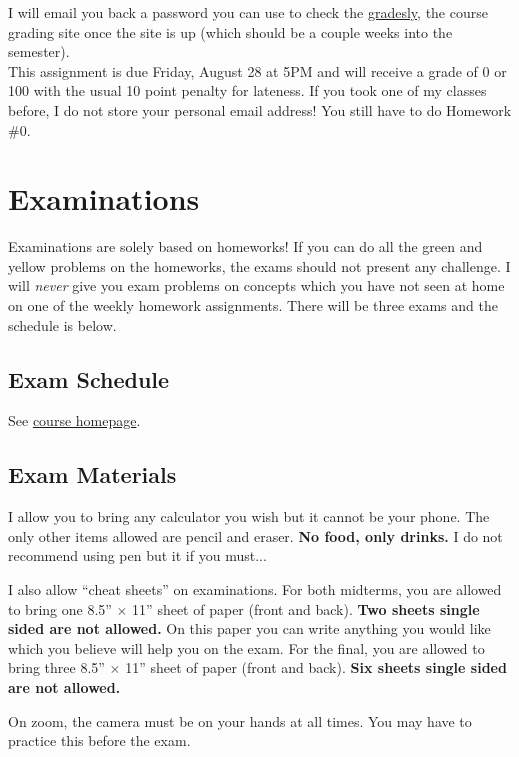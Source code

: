 \documentclass[12pt]{article}
\newcommand{\inred}[1]{\color{red}\textbf{#1} \color{black}}
\newcommand{\coursewebpage}{\href{https://github.com/kapelner/QC_Math_621_Fall_2020}{course homepage}}
\newcommand{\qu}[1]{``#1''}
\begin{document}
I will email you back a password you can use to check the \href{http://gradesly.com}{gradesly}, the course grading site once the site is up (which should be a couple weeks into the semester). \\

This assignment is due Friday, August 28 at 5PM and will receive a grade of 0 or 100 with the usual 10 point penalty for lateness. If you took one of my classes before, I do not store your personal email address! You still have to do Homework \#0.


\section*{Examinations}

Examinations are solely based on homeworks! If you can do all the green and yellow problems on the homeworks, the exams should not present any challenge. I will \textit{never} give you exam problems on concepts which you have not seen at home on one of the weekly homework assignments. There will be three exams and the schedule is below.

\subsection*{Exam Schedule}\label{subsec:exam_schedule}

See \coursewebpage.

\subsection*{Exam Materials}

I allow you to bring any calculator you wish but it cannot be your phone. The only other items allowed are pencil and eraser. \inred{No food, only drinks.} I do not recommend using pen but it if you must...

I also allow \qu{cheat sheets} on examinations. For both midterms, you are allowed to bring one 8.5'' $\times$ 11'' sheet of paper (front and back). \inred{Two sheets single sided are not allowed.} On this paper you can write anything you would like which you believe will help you on the exam. For the final, you are allowed to bring three 8.5'' $\times$ 11'' sheet of paper (front and back). \inred{Six sheets single sided are not allowed.} %

On zoom, the camera must be on your hands at all times. You may have to practice this before the exam.
\end{document}
